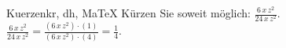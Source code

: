 \begin{MAufgabe}{Kuerzen}{kr, dh, MaTeX}
K\"urzen Sie soweit m\"oglich: $\frac{6\, x\, z^2}{24\, x\, z^2}$.\\ 
\ifLsg\MLoesung
\quad $\frac{6\, x\, z^2}{24\, x\, z^2}=\frac{(6\, x\, z^2)\cdot(1)}{(6\, x\, z^2)\cdot(4)}=\frac{1}{4}$.\else\relax\fi
 \end{MAufgabe}